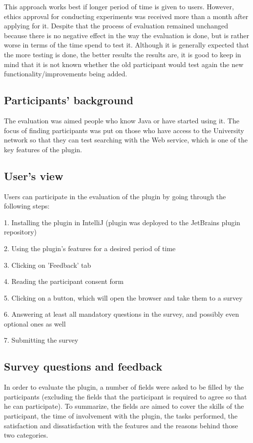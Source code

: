 \documentclass{l4proj}
\begin{document}
This approach works best if longer period of time is given to users. However, ethics approval for conducting experiments was received more than a month after applying for it. Despite that the process of evaluation remained unchanged because there is no negative effect in the way the evaluation is done, but is rather worse in terms of the time spend to test it. Although it is generally expected that the more testing is done, the better results the results are, it is good to keep in mind that it is not known whether the old participant would test again the new functionality/improvements being added.

\subsection{Participants' background}
The evaluation was aimed people who know Java or have started using it. The focus of finding participants was put on those who have access to the University network so that they can test searching with the Web service, which is one of the key features of the plugin. 

\subsection{User's view}
Users can participate in the evaluation of the plugin by going through the following steps:

1. Installing the plugin in IntelliJ (plugin was deployed to the JetBrains plugin repository)

2. Using the plugin's features for a desired period of time

3. Clicking on 'Feedback' tab

4. Reading the participant consent form

5. Clicking on a button, which will open the browser and take them to a survey

6. Answering at least all mandatory questions in the survey, and possibly even optional ones as well

7. Submitting the survey

\subsection{Survey questions and feedback}
In order to evaluate the plugin, a number of fields were asked to be filled by the participants (excluding the fields that the participant is required to agree so that he can participate). To summarize, the fields are aimed to cover the skills of the participant, the time of involvement with the plugin, the tasks performed, the satisfaction and dissatisfaction with the features and the reasons behind those two categories.
\end{document}
